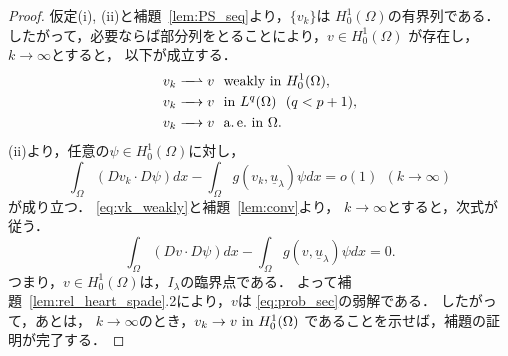 \begin{proof}
 仮定(i), (ii)と補題~\ref{lem:PS_seq}より，$\{v_k \}$は
 $H_0^1(\Omega)$の有界列である．
 したがって，必要ならば部分列をとることにより，$v \in H_0^1(\Omega)$
 が存在し，$k \to \infty$とすると，
 以下が成立する．
 \begin{align}
  v_k \xrightharpoonup{ \mbox{ ~ } } v & \ \ \text{weakly~} \tin
  H_0^1(\Omega), \label{eq:vk_weakly} \\
  v_k \xrightarrow{ \mbox{ ~ } } v & \ \ \tin L^q(\Omega) \ \
   (q < p+1), \label{eq:vk_Lq} \\
  v_k \xrightarrow{ \mbox{ ~ } } v & \ \ \ae \tin \Omega. 
    \label{eq:vk_ae}
 \end{align}
 (ii)より，任意の$\psi \in H_0^1(\Omega)$に対し，
 \[
 \int_\Omega (Dv_k \cdot D\psi) dx - \int_\Omega g(v_k,
 \underline{u}_\lambda) \psi dx = o(1) \ \ (k \to \infty)
 \]
 が成り立つ．
 \eqref{eq:vk_weakly}と補題~\ref{lem:conv}より，
 $k \to \infty$とすると，次式が従う．
 \begin{equation}
  \int_\Omega (Dv \cdot D\psi) dx - \int_\Omega g(v,
   \underline{u}_\lambda) \psi dx = 0. \label{eq:intvpsi}
 \end{equation}
 つまり，$v \in H_0^1(\Omega)$は，$I_\lambda$の臨界点である．
 よって補題~\ref{lem:rel_heart_spade}.2により，$v$は
 \ref{eq:prob_sec}の弱解である．
 したがって，あとは，
 $k \to \infty$のとき，$v_k \to v ~\text{in}~ H_0^1(\Omega)$
 であることを示せば，補題の証明が完了する．


\end{proof}
